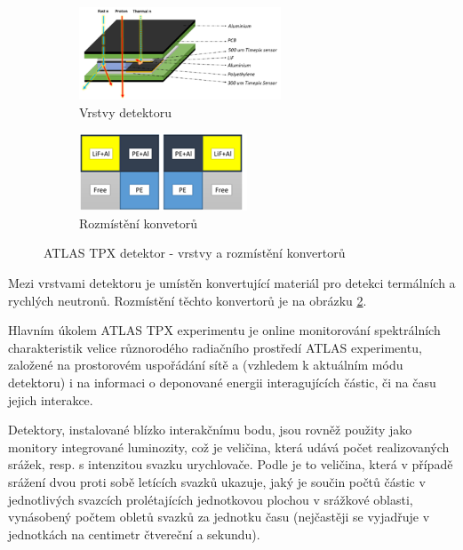 \begin{figure}[th]
	\begin{center}
		\begin{subfigure}{6cm}
			\includegraphics[width=6cm]{figures/tpx_lay.png}	
			\caption{Vrstvy detektoru}
			\label{fig:tpx_detector_layers}
		\end{subfigure}
		\hspace{0.5cm}
		\begin{subfigure}{5cm}
			\includegraphics[width=5cm]{figures/tpx_conv.png}
			\caption{Rozmístění konvetorů}
			\label{fig:tpx_detector_convertors}
		\end{subfigure}
		\caption{ATLAS TPX detektor - vrstvy a rozmístění konvertorů}
		\label{fig:tpx_detector}
	\end{center}			
\end{figure}

Mezi vrstvami detektoru je umístěn konvertující materiál pro detekci termálních a rychlých neutronů. Rozmístění těchto konvertorů je na obrázku \ref{fig:tpx_detector_convertors}.

Hlavním úkolem ATLAS TPX experimentu je online monitorování spektrálních charakteristik velice různorodého radiačního prostředí ATLAS experimentu, založené na prostorovém uspořádání sítě a (vzhledem k aktuálním módu detektoru) i na informaci o deponované energii interagujících částic, či na času jejich interakce. 


Detektory, instalované blízko interakčnímu bodu, jsou rovněž použity jako monitory integrované luminozity, což je veličina, která udává počet realizovaných srážek, resp. s intenzitou svazku urychlovače. Podle \cite{wagner:o_lhc} je to veličina, která v případě srážení dvou proti sobě letících svazků ukazuje, jaký je součin počtů částic v jednotlivých svazcích prolétajících jednotkovou plochou v srážkové oblasti, vynásobený počtem obletů svazků za jednotku času (nejčastěji se vyjadřuje v jednotkách na centimetr čtvereční a sekundu).

